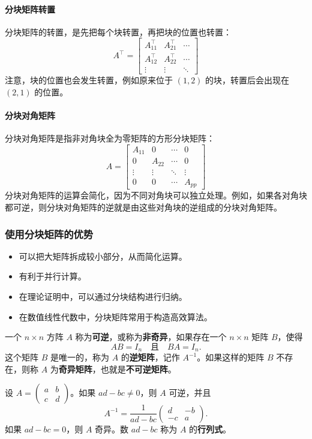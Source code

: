 \paragraph*{分块矩阵转置}
分块矩阵的转置，是先把每个块转置，再把块的位置也转置：
\[
A^\top=\begin{bmatrix}
A_{11}^\top & A_{21}^\top & \cdots\\
A_{12}^\top & A_{22}^\top & \cdots\\
\vdots & \vdots & \ddots
\end{bmatrix}
\]
注意，块的位置也会发生转置，例如原来位于 $(1,2)$ 的块，转置后会出现在 $(2,1)$ 的位置。

\paragraph*{分块对角矩阵}
分块对角矩阵是指非对角块全为零矩阵的方形分块矩阵：
\[
A=\begin{bmatrix}
A_{11}&0&\cdots&0\\
0&A_{22}&\cdots&0\\
\vdots&\vdots&\ddots&\vdots\\
0&0&\cdots&A_{pp}
\end{bmatrix}
\]
分块对角矩阵的运算会简化，因为不同对角块可以独立处理。例如，如果各对角块都可逆，则分块对角矩阵的逆就是由这些对角块的逆组成的分块对角矩阵。

\subsubsection*{使用分块矩阵的优势}
\begin{itemize}
    \item 可以把大矩阵拆成较小部分，从而简化运算。
    \item 有利于并行计算。
    \item 在理论证明中，可以通过分块结构进行归纳。
    \item 在数值线性代数中，分块矩阵常用于构造高效算法。
\end{itemize}

\begin{definition}
一个 $n\times n$ 方阵 $A$ 称为\textbf{可逆}，或称为\textbf{非奇异}，如果存在一个 $n\times n$ 矩阵 $B$，使得
\[ AB=I_n \quad \text{且}\quad BA=I_n. \]
这个矩阵 $B$ 是唯一的，称为 $A$ 的\textbf{逆矩阵}，记作 $A^{-1}$。如果这样的矩阵 $B$ 不存在，则称 $A$ 为\textbf{奇异矩阵}，也就是\textbf{不可逆矩阵}。
\end{definition}

\begin{example}
设 $A=\begin{pmatrix}a&b\\c&d\end{pmatrix}$。如果 $ad-bc\neq0$，则 $A$ 可逆，并且
\[ A^{-1}=\frac{1}{ad-bc}\begin{pmatrix}d&-b\\-c&a\end{pmatrix}. \]
如果 $ad-bc=0$，则 $A$ 奇异。数 $ad-bc$ 称为 $A$ 的\textbf{行列式}。
\end{example}

